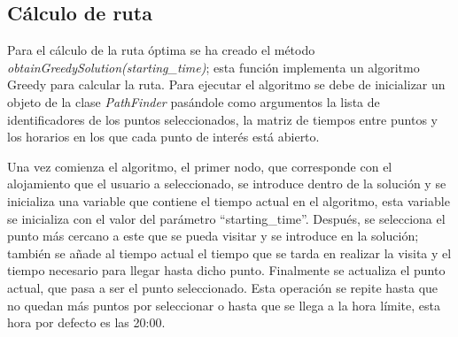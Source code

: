 \subsection{Cálculo de ruta}
Para el cálculo de la ruta óptima se ha creado el método \textit{obtainGreedySolution(starting\_time)}; esta función implementa un algoritmo Greedy para calcular la ruta. Para ejecutar el algoritmo se debe de inicializar un objeto de la clase \textit{PathFinder} pasándole como argumentos la lista de identificadores de los puntos seleccionados, la matriz de tiempos entre puntos y los horarios en los que cada punto de interés está abierto.\newline

Una vez comienza el algoritmo, el primer nodo, que corresponde con el alojamiento que el usuario a seleccionado, se introduce dentro de la solución y se inicializa una variable que contiene el tiempo actual en el algoritmo, esta variable se inicializa con el valor del parámetro \enquote{starting\_time}. Después, se selecciona el punto más cercano a este que se pueda visitar y se introduce en la solución; también se añade al tiempo actual el tiempo que se tarda en realizar la visita y el tiempo necesario para llegar hasta dicho punto. Finalmente se actualiza el punto actual, que pasa a ser el punto seleccionado. Esta operación se repite hasta que no quedan más puntos por seleccionar o hasta que se llega a la hora límite, esta hora por defecto es las 20:00.\newline

